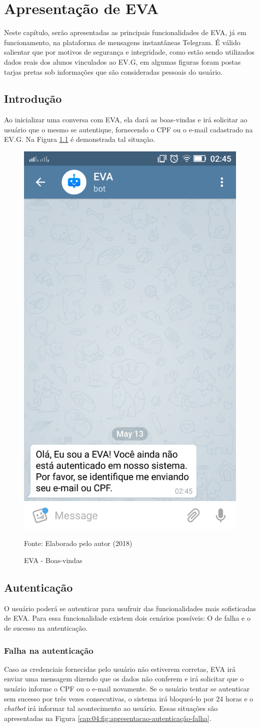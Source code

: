 \chapter{Apresentação de EVA}

Neste capítulo, serão apresentadas as principais funcionalidades de EVA, já em funcionamento, na plataforma de mensagens instantâneas Telegram. É válido salientar que por motivos de segurança e integridade, como estão sendo utilizados dados reais dos alunos vinculados ao EV.G, em algumas figuras foram postas tarjas pretas sob informações que são consideradas pessoais do usuário.

\section{Introdução}

Ao inicializar uma conversa com EVA, ela dará as boas-vindas e irá solicitar ao usuário que o mesmo se autentique, fornecendo o CPF ou o e-mail cadastrado na EV.G. Na Figura \ref{cap:04:fig:apresentacao-boas-vindas} é demonstrada tal situação.

\begin{figure}[htb!]
    \centering
    \includegraphics[width=0.2\linewidth]{src/imagens/apresentacao-boas-vindas.png}
    \caption{EVA - Boas-vindas} Fonte: Elaborado pelo autor (2018)
    \label{cap:04:fig:apresentacao-boas-vindas}
\end{figure}

\section{Autenticação}
O usuário poderá se autenticar para usufruir das funcionalidades mais sofisticadas de EVA. Para essa funcionalidade existem dois cenários possíveis: O de falha e o de sucesso na autenticação.

\subsection{Falha na autenticação}
Caso as credenciais fornecidas pelo usuário não estiverem corretas, EVA irá enviar uma mensagem dizendo que os dados não conferem e irá solicitar que o usuário informe o CPF ou o e-mail novamente. Se o usuário tentar se autenticar sem sucesso por três vezes consecutivas, o sistema irá bloqueá-lo por 24 horas e o \textit{chatbot} irá informar tal acontecimento ao usuário. Essas situações são apresentadas na Figura \ref{cap:04:fig:apresentacao-autenticação-falha}.

